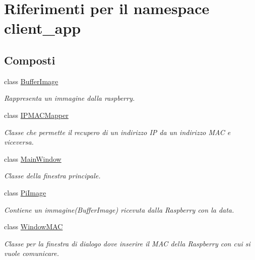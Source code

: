 \hypertarget{namespaceclient__app}{}\section{Riferimenti per il namespace client\+\_\+app}
\label{namespaceclient__app}
\subsection*{Composti}
\begin{DoxyCompactItemize}
\item 
class \mbox{\hyperlink{classclient__app_1_1_buffer_image}{Buffer\+Image}}
\begin{DoxyCompactList}\small\item\em Rappresenta un immagine dalla raspberry. \end{DoxyCompactList}\item 
class \mbox{\hyperlink{classclient__app_1_1_i_p_m_a_c_mapper}{I\+P\+M\+A\+C\+Mapper}}
\begin{DoxyCompactList}\small\item\em Classe che permette il recupero di un indirizzo IP da un indirizzo M\+AC e viceversa. \end{DoxyCompactList}\item 
class \mbox{\hyperlink{classclient__app_1_1_main_window}{Main\+Window}}
\begin{DoxyCompactList}\small\item\em Classe della finestra principale. \end{DoxyCompactList}\item 
class \mbox{\hyperlink{classclient__app_1_1_pi_image}{Pi\+Image}}
\begin{DoxyCompactList}\small\item\em Contiene un immagine(\+Buffer\+Image) ricevuta dalla Raspberry con la data. \end{DoxyCompactList}\item 
class \mbox{\hyperlink{classclient__app_1_1_window_m_a_c}{Window\+M\+AC}}
\begin{DoxyCompactList}\small\item\em Classe per la finestra di dialogo dove inserire il M\+AC della Raspberry con cui si vuole comunicare. \end{DoxyCompactList}\end{DoxyCompactItemize}
